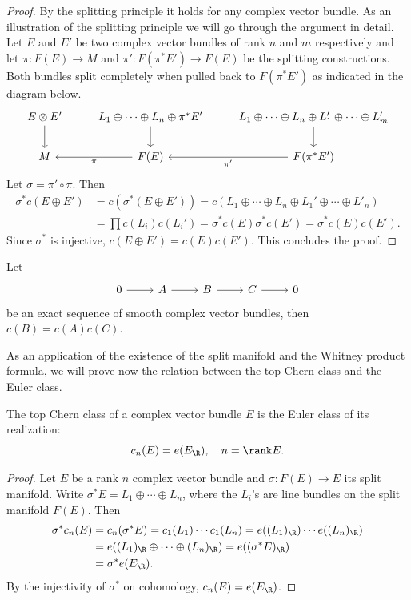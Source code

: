 \begin{proof}
By the splitting principle it holds for any complex vector bundle. As an illustration of the splitting principle we will go through the argument in detail. Let $E$ and 
$E'$ be two complex vector bundles of rank $n$ and $m$ respectively and let $\pi:F(E)\to M$ and $\pi':F(\pi^*E')\to F(E)$ be the splitting constructions.
Both bundles split completely when pulled back to $F(\pi^*E')$ as indicated in the diagram below.
\[\begin{tikzcd}
E\otimes E'\ar[d]&L_1\oplus\cdots\oplus L_n\oplus\pi^*E'\ar[d]&L_1\oplus\cdots\oplus L_n\oplus L_1'\oplus\cdots\oplus L_m'\ar[d]\\
M&F(E)\ar[l,"\pi"]&F(\pi^*E')\ar[l,"\pi'"]
\end{tikzcd}\]
Let $\sigma=\pi'\circ\pi$. Then
\begin{align*}
\sigma^*c(E\oplus E')&=c(\sigma^*(E\oplus E'))=c(L_1\oplus\cdots\oplus L_n\oplus L_1'\oplus\cdots\oplus L'_n)\\
&=\prod c(L_i)c(L_i')=\sigma^*c(E)\sigma^*c(E')=\sigma^*c(E)c(E').
\end{align*}
Since $\sigma^*$ is injective, $c(E\oplus E')=c(E)c(E')$. This concludes the proof.
\end{proof}
\begin{corollary}
Let
\[\begin{tikzcd}
0\ar[r]&A\ar[r]&B\ar[r]&C\ar[r]&0
\end{tikzcd}\]
be an exact sequence of smooth complex vector bundles, then $c(B)=c(A)c(C)$.
\end{corollary}
As an application of the existence of the split manifold and the Whitney product formula, we will prove now the relation between the top Chern class and the Euler class.
\begin{proposition}
The top Chern class of a complex vector bundle $E$ is the Euler class of its realization:
\[c_n(E)=e(E_{\R}),\quad n=\rank E.\]
\end{proposition}
\begin{proof}
Let $E$ be a rank $n$ complex vector bundle and $\sigma:F(E)\to E$ its split manifold. Write $\sigma^*E=L_1\oplus\cdots\oplus L_n$, where the $L_i$'s are line bundles 
on the split manifold $F(E)$. Then
\begin{align*}
\sigma^*c_n(E)&=c_n(\sigma^*E)=c_1(L_1)\cdots c_1(L_n)=e((L_1)_{\R})\cdots e((L_n)_{\R})\\
&=e((L_1)_{\R}\oplus\cdots\oplus(L_n)_{\R})=e((\sigma^*E)_{\R})\\
&=\sigma^*e(E_\R).
\end{align*}
By the injectivity of $\sigma^*$ on cohomology, $c_n(E)=e(E_\R)$.
\end{proof}
